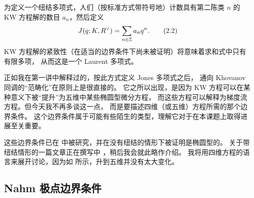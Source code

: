 
为定义一个纽结多项式，人们（按标准方式带符号地）计数具有第二陈类 $n$ 的
KW 方程解的数目 $a_n$，然后定义
\begin{equation}\stepcounter{equation}
  J(q;K,R^{\vee})=\sum_{n\in\ZZ}a_n q^{n} .
  \tag{2.2}\label{eq:2.2}
\end{equation}
KW 方程解的紧致性（在适当的边界条件下尚未被证明）将意味着求和式中只有有限多项，
从而这是一个 Laurent 多项式。


正如我在第一讲中解释过的，按此方式定义 Jones 多项式之后，
通向 Khovanov 同调的“范畴化”在原则上是很直接的。
它之所以出现，是因为 KW 方程可以在某种意义下被“提升”为五维中某些椭圆型微分方程，
而这些方程可以解释为梯度流方程。但今天我不再多谈这一点，
而是要描述四维（或五维）方程所需的那个边界条件。
这个边界条件属于可能有些陌生的类型，理解它对于在本课题上取得进展至关重要。

这些边界条件已在 \cite{MW} 中被研究，并在没有纽结的情形下被证明是椭圆型的。
关于带纽结情形的一篇文章正在撰写中 \cite{MWknots}，稍后我会就此略作介绍。
我将用四维方程的语言来展开讨论，因为如 \cite{MW} 所示，升到五维并没有太大变化。


\subsection{Nahm 极点边界条件}

